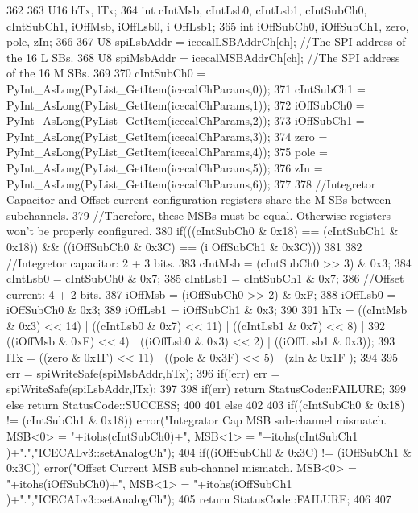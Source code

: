\begin{DoxyCode}
362 {                            
363     U16 hTx, lTx;
364     int cIntMsb, cIntLsb0, cIntLsb1, cIntSubCh0, cIntSubCh1, iOffMsb, iOffLsb0, i
      OffLsb1;
365     int iOffSubCh0, iOffSubCh1, zero, pole, zIn;
366 
367     U8 spiLsbAddr = icecalLSBAddrCh[ch];            //The SPI address of the 16 L
      SBs.
368     U8 spiMsbAddr = icecalMSBAddrCh[ch];            //The SPI address of the 16 M
      SBs.
369 
370     cIntSubCh0 = PyInt_AsLong(PyList_GetItem(icecalChParams,0));
371     cIntSubCh1 = PyInt_AsLong(PyList_GetItem(icecalChParams,1));
372     iOffSubCh0 = PyInt_AsLong(PyList_GetItem(icecalChParams,2));
373     iOffSubCh1 = PyInt_AsLong(PyList_GetItem(icecalChParams,3));
374     zero             = PyInt_AsLong(PyList_GetItem(icecalChParams,4));
375     pole             = PyInt_AsLong(PyList_GetItem(icecalChParams,5));
376     zIn              = PyInt_AsLong(PyList_GetItem(icecalChParams,6));
377 
378     //Integretor Capacitor and Offset current configuration registers share the M
      SBs between subchannels.
379     //Therefore, these MSBs must be equal. Otherwise registers won't be properly 
      configured. 
380     if(((cIntSubCh0 & 0x18) == (cIntSubCh1 & 0x18)) && ((iOffSubCh0 & 0x3C) == (i
      OffSubCh1 & 0x3C)))
381     {
382         //Integretor capacitor: 2 + 3 bits.
383         cIntMsb  = (cIntSubCh0 >> 3) & 0x3;
384         cIntLsb0 =  cIntSubCh0 & 0x7;
385         cIntLsb1 =  cIntSubCh1 & 0x7;
386         //Offset current: 4 + 2 bits.
387         iOffMsb  = (iOffSubCh0 >> 2) & 0xF;
388         iOffLsb0 =  iOffSubCh0 & 0x3;
389         iOffLsb1 =  iOffSubCh1 & 0x3;
390 
391         hTx =  ((cIntMsb & 0x3) << 14) | ((cIntLsb0 & 0x7) << 11) | ((cIntLsb1 & 
      0x7) << 8) | 
392                      ((iOffMsb & 0xF) << 4)  | ((iOffLsb0 & 0x3) << 2)  | ((iOffL
      sb1 & 0x3));
393         lTx =    ((zero & 0x1F) << 11)   | ((pole & 0x3F) << 5)     | (zIn & 0x1F
      );
394 
395                             err = spiWriteSafe(spiMsbAddr,hTx); 
396         if(!err)    err = spiWriteSafe(spiLsbAddr,lTx);
397 
398         if(err) return StatusCode::FAILURE;
399         else        return StatusCode::SUCCESS;
400     }
401     else 
402     {
403         if((cIntSubCh0 & 0x18) != (cIntSubCh1 & 0x18)) error("Integrator Cap MSB 
      sub-channel mismatch. MSB<0> = "+itohs(cIntSubCh0)+", MSB<1> = "+itohs(cIntSubCh1
      )+".","ICECALv3::setAnalogCh");
404         if((iOffSubCh0 & 0x3C) != (iOffSubCh1 & 0x3C)) error("Offset Current MSB 
      sub-channel mismatch. MSB<0> = "+itohs(iOffSubCh0)+", MSB<1> = "+itohs(iOffSubCh1
      )+".","ICECALv3::setAnalogCh");
405         return StatusCode::FAILURE;
406     }
407 }
\end{DoxyCode}
